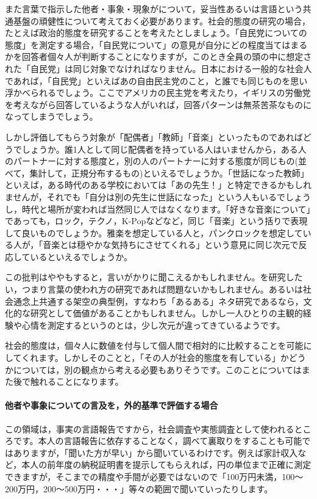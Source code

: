 \documentclass{ltjsbook}
\begin{document}
また言葉で指示した他者・事象・現象がについて，妥当性あるいは言語という共通基盤の頑健性について考えておく必要があります。社会的態度の研究の場合，たとえば政治的態度を研究することを考えたとしましょう。「自民党についての態度」を測定する場合，「自民党について」の意見が自分にどの程度当てはまるかを回答者個々人が判断することになりますが，このとき全員の頭の中に想定された「自民党」は同じ対象でなければなりません。日本における一般的な社会人であれば，「自民党」といえばあの自由民主党のこと，と誰でも同じものを思い浮かべられるでしょう。ここでアメリカの民主党を考えたり，イギリスの労働党を考えながら回答しているような人がいれば，回答パターンは無茶苦茶なものになってしまうでしょう。

しかし評価してもらう対象が「配偶者」「教師」「音楽」といったものであればどうでしょうか。誰1人として同じ配偶者を持っている人はいませんから，ある人のパートナーに対する態度と，別の人のパートナーに対する態度が同じもの(並べて，集計して，正規分布するもの)といえるでしょうか。「世話になった教師」といえば，ある時代のある学校においては「あの先生！」と特定できるかもしれませんが，それでも「自分は別の先生に世話になった」という人もいるでしょうし，時代と場所が変われば当然同じ人ではなくなります。「好きな音楽について」であっても，ロック，テクノ，K-Popなどなど，同じ「音楽」という括りで表現して良いものでしょうか。雅楽を想定している人と，パンクロックを想定している人が，「音楽とは穏やかな気持ちにさせてくれる」という意見に同じ次元で反応しているといえるでしょうか。

この批判はややもすると，言いがかりに聞こえるかもしれません。を研究したい，つまり言葉の使われ方の研究であれば問題ないかもしれません。あるいは社会通念上共通する架空の典型例，すなわち「あるある」ネタ研究であるなら，文化的な研究として価値があることかもしれません。しかし一人ひとりの主観的経験や心情を測定するというのとは，少し次元が違ってきているようです。

社会的態度は，個々人に数値を付与して個人間で相対的に比較することを可能にしてくれます。しかしそのことと，「その人が社会的態度を有している」かどうかについては，別の観点から考える必要もありそうです。このことについてはまた後で触れることになります。

\paragraph{他者や事象についての言及を，外的基準で評価する場合}
この領域は，事実の言語報告ですから，社会調査や実態調査として使われるところです。本人の言語報告に依存することなく，調べて裏取りをすることも可能ではありますが，「聞いた方が早い」から聞いているわけです。例えば家計収入など，本人の前年度の納税証明書を提示してもらえれば，円の単位まで正確に測定できますが，そこまでの精度や手間が必要ではないので「100万円未満，100〜200万円，200〜500万円・・・」等々の範囲で聞いていったりします。
\end{document}
